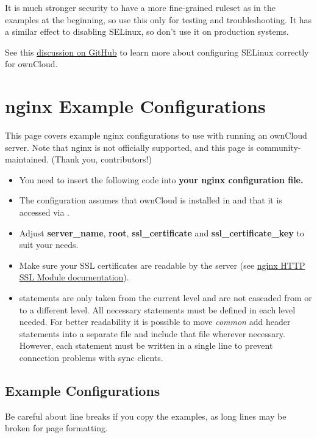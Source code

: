 \documentclass[letterpaper,10pt,english]{sphinxmanual}
\begin{document}
It is much stronger security to have a more fine-grained ruleset as in the examples at the beginning, so use this only for testing and troubleshooting. It has a similar effect to disabling SELinux, so don't use it on production systems.

See this \href{https://github.com/owncloud/documentation/pull/2693}{discussion on GitHub} to learn more about configuring SELinux correctly for ownCloud.


\section{nginx Example Configurations}
\label{installation/nginx_examples::doc}\label{installation/nginx_examples:nginx-example-configurations}
This page covers example nginx configurations to use with running an ownCloud
server. Note that nginx is not officially supported, and this page is
community-maintained. (Thank you, contributors!)
\begin{itemize}
\item {} 
You need to insert the following code into \textbf{your nginx configuration file.}

\item {} 
The configuration assumes that ownCloud is installed in
 and that it is accessed via
.

\item {} 
Adjust \textbf{server\_name}, \textbf{root}, \textbf{ssl\_certificate} and
\textbf{ssl\_certificate\_key} to suit your needs.

\item {} 
Make sure your SSL certificates are readable by the server (see \href{http://wiki.nginx.org/HttpSslModule}{nginx HTTP
SSL Module documentation}).

\item {} 
 statements are only taken from the current level and are not
cascaded from or to a different level. All necessary 
statements must be defined in each level needed. For better readability it
is possible to move \emph{common} add header statements into a separate file
and include that file wherever necessary. However, each 
statement must be written in a single line to prevent connection problems
with sync clients.

\end{itemize}


\subsection{Example Configurations}
\label{installation/nginx_examples:example-configurations}
Be careful about line breaks if you copy the examples, as long lines may be broken
for page formatting.
\end{document}
